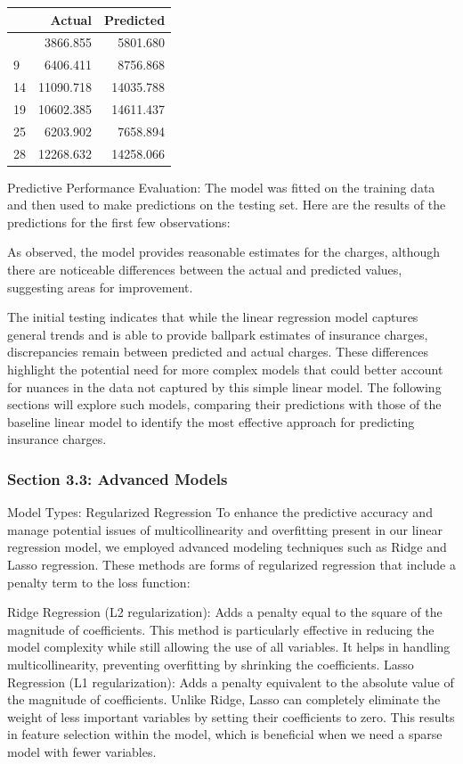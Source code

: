 \documentclass[
  12pt,
]{article}
\begin{document}
\begin{longtable}[]{@{}lrr@{}}
\toprule\noalign{}
& Actual & Predicted \\
\midrule\noalign{}
\endhead
\bottomrule\noalign{}
\endlastfoot
5 & 3866.855 & 5801.680 \\
9 & 6406.411 & 8756.868 \\
14 & 11090.718 & 14035.788 \\
19 & 10602.385 & 14611.437 \\
25 & 6203.902 & 7658.894 \\
28 & 12268.632 & 14258.066 \\
\end{longtable}

Predictive Performance Evaluation: The model was fitted on the training
data and then used to make predictions on the testing set. Here are the
results of the predictions for the first few observations:

As observed, the model provides reasonable estimates for the charges,
although there are noticeable differences between the actual and
predicted values, suggesting areas for improvement.

The initial testing indicates that while the linear regression model
captures general trends and is able to provide ballpark estimates of
insurance charges, discrepancies remain between predicted and actual
charges. These differences highlight the potential need for more complex
models that could better account for nuances in the data not captured by
this simple linear model. The following sections will explore such
models, comparing their predictions with those of the baseline linear
model to identify the most effective approach for predicting insurance
charges.

\subsubsection{Section 3.3: Advanced
Models}\label{section-3.3-advanced-models}

Model Types: Regularized Regression To enhance the predictive accuracy
and manage potential issues of multicollinearity and overfitting present
in our linear regression model, we employed advanced modeling techniques
such as Ridge and Lasso regression. These methods are forms of
regularized regression that include a penalty term to the loss function:

Ridge Regression (L2 regularization): Adds a penalty equal to the square
of the magnitude of coefficients. This method is particularly effective
in reducing the model complexity while still allowing the use of all
variables. It helps in handling multicollinearity, preventing
overfitting by shrinking the coefficients. Lasso Regression (L1
regularization): Adds a penalty equivalent to the absolute value of the
magnitude of coefficients. Unlike Ridge, Lasso can completely eliminate
the weight of less important variables by setting their coefficients to
zero. This results in feature selection within the model, which is
beneficial when we need a sparse model with fewer variables.
\end{document}
